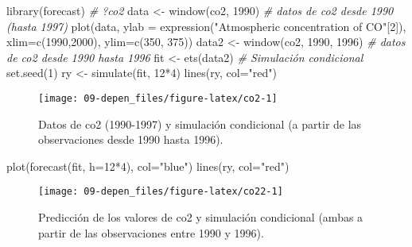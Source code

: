 \documentclass[
]{book}
\newenvironment{Shaded}{\begin{snugshade}}{\end{snugshade}}
\newcommand{\AttributeTok}[1]{\textcolor[rgb]{0.77,0.63,0.00}{#1}}
\newcommand{\CommentTok}[1]{\textcolor[rgb]{0.56,0.35,0.01}{\textit{#1}}}
\newcommand{\DecValTok}[1]{\textcolor[rgb]{0.00,0.00,0.81}{#1}}
\newcommand{\FunctionTok}[1]{\textcolor[rgb]{0.00,0.00,0.00}{#1}}
\newcommand{\NormalTok}[1]{#1}
\newcommand{\OtherTok}[1]{\textcolor[rgb]{0.56,0.35,0.01}{#1}}
\newcommand{\SpecialCharTok}[1]{\textcolor[rgb]{0.00,0.00,0.00}{#1}}
\newcommand{\StringTok}[1]{\textcolor[rgb]{0.31,0.60,0.02}{#1}}
\theoremstyle{break}
\theoremstyle{definition}
\theoremstyle{definition}
\theoremstyle{definition}
\theoremstyle{definition}
\theoremstyle{remark}
\begin{document}
\begin{Shaded}
\begin{Highlighting}[]
\FunctionTok{library}\NormalTok{(forecast)}
\CommentTok{\# ?co2}
\NormalTok{data }\OtherTok{\textless{}{-}} \FunctionTok{window}\NormalTok{(co2, }\DecValTok{1990}\NormalTok{) }\CommentTok{\# datos de co2 desde 1990 (hasta 1997)}
\FunctionTok{plot}\NormalTok{(data, }\AttributeTok{ylab =} \FunctionTok{expression}\NormalTok{(}\StringTok{"Atmospheric concentration of CO"}\NormalTok{[}\DecValTok{2}\NormalTok{]), }
     \AttributeTok{xlim=}\FunctionTok{c}\NormalTok{(}\DecValTok{1990}\NormalTok{,}\DecValTok{2000}\NormalTok{), }\AttributeTok{ylim=}\FunctionTok{c}\NormalTok{(}\DecValTok{350}\NormalTok{, }\DecValTok{375}\NormalTok{))}
\NormalTok{data2 }\OtherTok{\textless{}{-}} \FunctionTok{window}\NormalTok{(co2, }\DecValTok{1990}\NormalTok{, }\DecValTok{1996}\NormalTok{) }\CommentTok{\# datos de co2 desde 1990 hasta 1996}
\NormalTok{fit }\OtherTok{\textless{}{-}} \FunctionTok{ets}\NormalTok{(data2)}
\CommentTok{\# Simulación condicional}
\FunctionTok{set.seed}\NormalTok{(}\DecValTok{1}\NormalTok{)}
\NormalTok{ry }\OtherTok{\textless{}{-}} \FunctionTok{simulate}\NormalTok{(fit, }\DecValTok{12}\SpecialCharTok{*}\DecValTok{4}\NormalTok{)}
\FunctionTok{lines}\NormalTok{(ry, }\AttributeTok{col=}\StringTok{"red"}\NormalTok{)}
\end{Highlighting}
\end{Shaded}

\begin{figure}[!htb]

{\centering \texttt{[image: 09-depen\_files/figure-latex/co2-1]} 

}

\caption{Datos de co2 (1990-1997) y simulación condicional (a partir de las observaciones desde 1990 hasta 1996).}\label{fig:co2}
\end{figure}

\begin{Shaded}
\begin{Highlighting}[]
\FunctionTok{plot}\NormalTok{(}\FunctionTok{forecast}\NormalTok{(fit, }\AttributeTok{h=}\DecValTok{12}\SpecialCharTok{*}\DecValTok{4}\NormalTok{), }\AttributeTok{col=}\StringTok{"blue"}\NormalTok{)}
\FunctionTok{lines}\NormalTok{(ry, }\AttributeTok{col=}\StringTok{"red"}\NormalTok{)}
\end{Highlighting}
\end{Shaded}

\begin{figure}[!htb]

{\centering \texttt{[image: 09-depen\_files/figure-latex/co22-1]} 

}

\caption{Predicción de los valores de co2 y simulación condicional (ambas a partir de las observaciones entre 1990 y 1996).}\label{fig:co22}
\end{figure}
\end{document}
